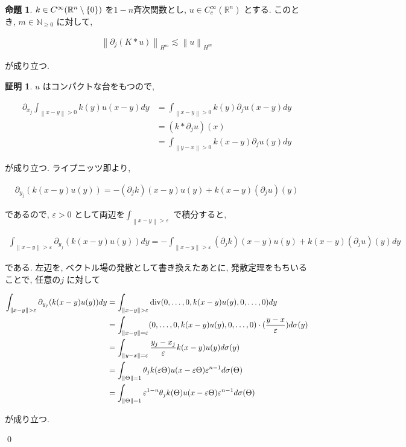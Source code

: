 \documentclass[10pt, fleqn, label-section=none]{bxjsarticle}
\theoremstyle{definition}
\newtheorem{prop}[dfn]{命題}
\newtheorem*{pf*}{証明}
\newcommand{\veps}{\varepsilon}
\newcommand{\paren}[1]{\mleft( #1\mright )}
\newcommand{\cbra}[1]{\mleft\{#1\mright\}}
\newcommand{\norm}[1]{\left\|#1\right\|}
\renewcommand{\;}{\, ; \,}
\renewcommand{\div}{\textrm{div}}
\begin{document}
\begin{prop}$k \in C^\infty(\mathbb R^n \setminus \cbra{0} )$ を$1-n$斉次関数とし, $u \in C_c^\infty (\mathbb R^n)$ とする. このとき, $m \in \mathbb N_{\geq 0}$ に対して, 

\begin{align*} \norm{\partial_j (K * u)}_{H^m} \lesssim \norm{u}_{H^m} \end{align*}

が成り立つ. 

\end{prop}
\begin{pf*}

$u $ はコンパクトな台をもつので, 

\begin{align*} \partial_{x_j} \int_{\norm{x- y} > 0} k(y)u(x - y) dy &= \int_{\norm{x- y} > 0} k(y)\partial_{j} u (x - y) dy 
\\& = (k * \partial_j u ) (x) 
\\&= \int_{\norm{y-x} > 0} k(x- y) \partial_j u(y) dy \end{align*}

が成り立つ. ライプニッツ即より, 

\begin{align*} \partial_{y_j}(k(x-y)u(y)) = - (\partial_j k)(x-y) u(y) + k(x-y)(\partial_j u)(y)         \end{align*}

であるので, $\veps > 0$ として両辺を$\int_{\norm{x-y}> \veps }$ で積分すると, 

\begin{align*}  \int_{\norm{x- y} > \veps}   \partial_{y_j}(k(x-y)u(y)) dy  = -   \int_{\norm{x- y} > \veps }  (\partial_j k)(x-y) u(y) + k(x-y)(\partial_j u)(y)  dy                          \end{align*}

である. 左辺を, ベクトル場の発散として書き換えたあとに, 発散定理をもちいることで, 任意の$j$ に対して

\begin{align*}      \int_{\norm{x- y} > \veps}   \partial_{y_j}(k(x-y)u(y)) dy 
&=  \int_{\norm{x- y} > \veps}   \div\paren{  0, \ldots, 0 ,  k(x-y)u(y) , 0,  \ldots,  0 } dy      
\\&=   \int_{\norm{x- y} = \veps}   \paren{  0, \ldots, 0 ,  k(x-y)u(y) , 0,  \ldots,  0 } \cdot (\frac{y-x}{\veps})d\sigma(y)    
\\&= \int_{\norm{y-x} = \veps } \frac{y_j - x_j}{ \veps } k(x-y ) u(y) d\sigma(y)  
\\&= \int_{\norm \Theta = 1} \theta_j k(\veps \Theta ) u(x - \veps \Theta ) \veps^{n-1 } d\sigma(\Theta ) 
\\&=   \int_{\norm \Theta = 1} \veps^{1 - n} \theta_j k(\Theta ) u(x - \veps \Theta ) \veps^{n-1 }  d\sigma(\Theta )      \end{align*}

が成り立つ. 



\qed
\end{pf*}
\end{document}
